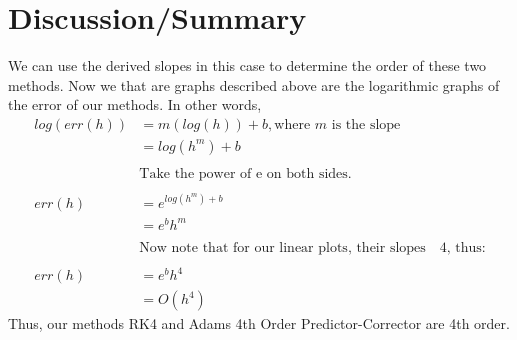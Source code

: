 \documentclass[12pt]{article}
\begin{document}
\section{Discussion/Summary}
We can use the derived slopes in this case to determine the order of these two methods. Now we that are graphs described above are the logarithmic graphs of the error of our methods. In other words,
\begin{align} \nonumber
log(err(h)) &= m(log(h)) + b, \mbox{where } m \mbox{ is the slope} \\ \nonumber
&= log(h^m) + b \\ \nonumber
\\ \nonumber &\mbox{Take the power of e on both sides.} \\ \nonumber \\ \nonumber
err(h) &= e^{log(h^m) + b} \\ \nonumber
&= e^bh^m \\ \nonumber
\\ \nonumber &\mbox{Now note that for our linear plots, their slopes ~ 4, thus:} \\ \nonumber \\ \nonumber
err(h) &= e^bh^4 \\ \nonumber
&= O(h^4)
\end{align}
Thus, our methods RK4 and Adams 4th Order Predictor-Corrector are 4th order.
\end{document}
